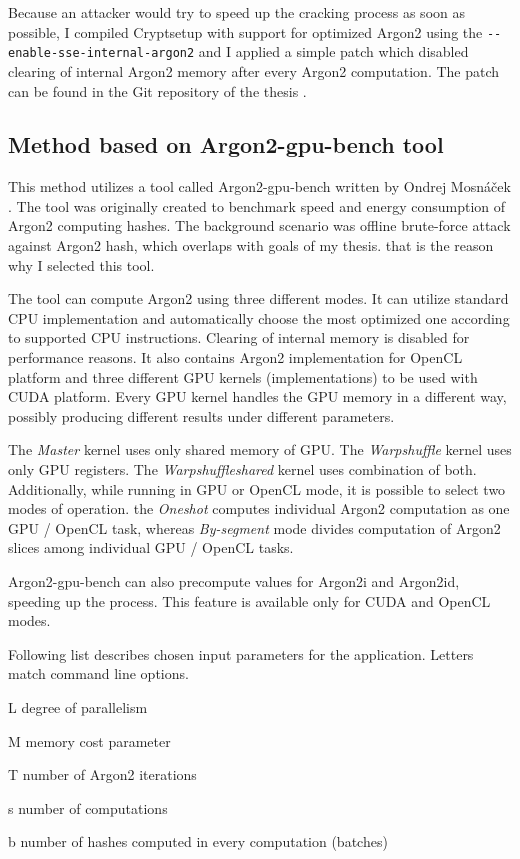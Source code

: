 \documentclass[nolof]{fithesis3}
\begin{document}
Because an attacker would try to speed up the cracking process as soon as possible, I compiled Cryptsetup with support for optimized Argon2 using the \verb+--enable-sse-internal-argon2+ and I applied a simple patch which disabled clearing of internal Argon2 memory after every Argon2 computation. The patch can be found in the Git repository of the thesis \parencite{thesisrepo}.

\subsection{Method based on Argon2-gpu-bench tool}
This method utilizes a tool called Argon2-gpu-bench written by Ondrej Mosnáček \parencite{argon2gpu}. The tool was originally created to benchmark speed and energy consumption of Argon2 computing hashes. The background scenario was offline brute-force attack against Argon2 hash, which overlaps with goals of my thesis. that is the reason why I selected this tool.

The tool can compute Argon2 using three different modes. It can utilize standard CPU implementation and automatically choose the most optimized one according to supported CPU instructions. Clearing of internal memory is disabled for performance reasons. It also contains Argon2 implementation for OpenCL platform and three different GPU kernels (implementations) to be used with CUDA platform. Every GPU kernel handles the GPU memory in a different way, possibly producing different results under different parameters.

The \emph{Master} kernel uses only shared memory of GPU. The \emph{Warpshuffle} kernel uses only GPU registers. The \emph{Warpshuffleshared} kernel uses combination of both. Additionally, while running in GPU or OpenCL mode, it is possible to select two modes of operation. the \emph{Oneshot} computes individual Argon2 computation as one GPU / OpenCL task, whereas \emph{By-segment} mode divides computation of Argon2 slices among individual GPU / OpenCL tasks.

Argon2-gpu-bench can also precompute values for Argon2i and Argon2id, speeding up the process. This feature is available only for CUDA and OpenCL modes.

Following list describes chosen input parameters for the application. Letters match command line options.

\begin{description}
\item{L} degree of parallelism

\item{M} memory cost parameter

\item{T} number of Argon2 iterations

\item{s} number of computations

\item{b} number of hashes computed in every computation (batches)
\end{description}
\end{document}
